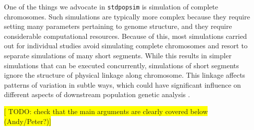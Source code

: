 \documentclass[hidelinks]{article}
\newcommand{\stdpopsim}{\texttt{stdpopsim}\xspace}
\begin{document}
One of the things we advocate in \texttt{\stdpopsim} is simulation of complete
chromosomes. Such simulations are typically more complex because they require
setting many parameters pertaining to genome structure, and they require
considerable computational resources. Because of this, most simulations carried
out for individual studies avoid simulating complete chromosomes and resort to
separate simulations of many short segments. While this results in simpler
simulations that can be executed concurrently, %
simulations of short segments ignore the structure of physical linkage along
chromosome. This linkage affects patterns of variation in subtle ways, which could
have significant influence on different aspects of downstream population genetic
analysis \citep{Nelson2020}. 


\noindent\colorbox{yellow}{[ TODO: check that the main arguments are clearly covered below (Andy/Peter?)]}
\end{document}
